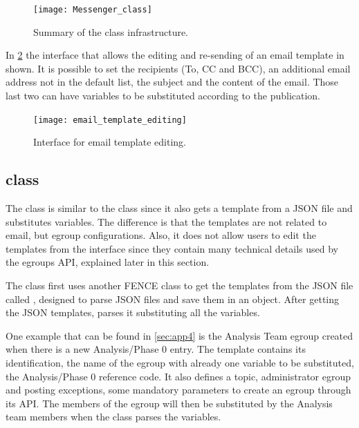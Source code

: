 \begin{figure}[htb]
  \centering
  \texttt{[image: Messenger\_class]}
  \caption{Summary of the  class infrastructure.}%
  \label{fig:Messenger_class}
\end{figure}

In \cref{fig:email_template_editing} the interface that allows the editing and re-sending of an email template in shown. It is possible to set the recipients (To, CC and BCC), an additional email address not in the default list, the subject and the content of the email.
Those last two can have variables to be substituted according to the publication. 

\begin{figure}[htb]
  \centering
  \texttt{[image: email\_template\_editing]}
  \caption{Interface for email template editing.}%
  \label{fig:email_template_editing}
\end{figure}


\subsection{ class}
\label{sec:EgroupManager_class}

The  class is similar to the  class since it also gets a template from a JSON file and substitutes variables.
The difference is that the templates are not related to email, but egroup configurations.
Also, it does not allow users to edit the templates from the interface since they contain many technical details used by the egroups API, explained later in this section.

The  class first uses another FENCE class to get the templates from the JSON file called , designed to parse JSON files and save them in an object.
After getting the JSON templates,  parses it substituting all the variables.

One example that can be found in \cref{sec:app4} is the Analysis Team egroup created when there is a new Analysis/Phase 0 entry.
The template contains its identification, the name of the egroup with already one variable to be substituted, the Analysis/Phase 0 reference code.
It also defines a topic, administrator egroup and posting exceptions, some mandatory parameters to create an egroup through its API.
The members of the egroup will then be substituted by the Analysis team members when the  class parses the variables.

